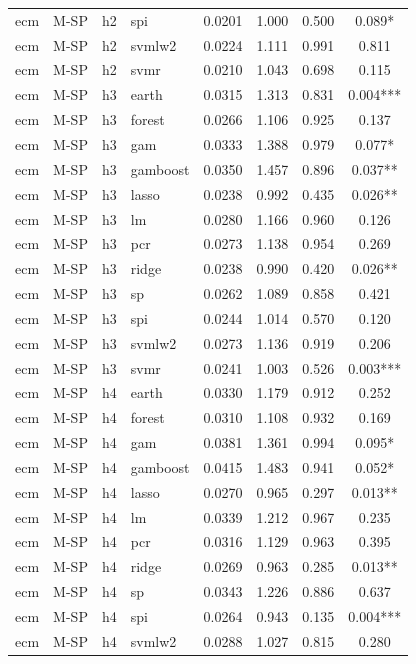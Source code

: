 \begin{ThreePartTable}
\begin{longtable}[t]{llclcccc}
ecm & M-SP & h2 & spi & 0.0201 & 1.000 & 0.500 & 0.089*\\
ecm & M-SP & h2 & svmlw2 & 0.0224 & 1.111 & 0.991 & 0.811\\
ecm & M-SP & h2 & svmr & 0.0210 & 1.043 & 0.698 & 0.115\\
\addlinespace
ecm & M-SP & h3 & earth & 0.0315 & 1.313 & 0.831 & 0.004***\\
ecm & M-SP & h3 & forest & 0.0266 & 1.106 & 0.925 & 0.137\\
ecm & M-SP & h3 & gam & 0.0333 & 1.388 & 0.979 & 0.077*\\
ecm & M-SP & h3 & gamboost & 0.0350 & 1.457 & 0.896 & 0.037**\\
ecm & M-SP & h3 & lasso & 0.0238 & 0.992 & 0.435 & 0.026**\\
ecm & M-SP & h3 & lm & 0.0280 & 1.166 & 0.960 & 0.126\\
ecm & M-SP & h3 & pcr & 0.0273 & 1.138 & 0.954 & 0.269\\
ecm & M-SP & h3 & ridge & 0.0238 & 0.990 & 0.420 & 0.026**\\
ecm & M-SP & h3 & sp & 0.0262 & 1.089 & 0.858 & 0.421\\
ecm & M-SP & h3 & spi & 0.0244 & 1.014 & 0.570 & 0.120\\
ecm & M-SP & h3 & svmlw2 & 0.0273 & 1.136 & 0.919 & 0.206\\
ecm & M-SP & h3 & svmr & 0.0241 & 1.003 & 0.526 & 0.003***\\
\addlinespace
ecm & M-SP & h4 & earth & 0.0330 & 1.179 & 0.912 & 0.252\\
ecm & M-SP & h4 & forest & 0.0310 & 1.108 & 0.932 & 0.169\\
ecm & M-SP & h4 & gam & 0.0381 & 1.361 & 0.994 & 0.095*\\
ecm & M-SP & h4 & gamboost & 0.0415 & 1.483 & 0.941 & 0.052*\\
ecm & M-SP & h4 & lasso & 0.0270 & 0.965 & 0.297 & 0.013**\\
ecm & M-SP & h4 & lm & 0.0339 & 1.212 & 0.967 & 0.235\\
ecm & M-SP & h4 & pcr & 0.0316 & 1.129 & 0.963 & 0.395\\
ecm & M-SP & h4 & ridge & 0.0269 & 0.963 & 0.285 & 0.013**\\
ecm & M-SP & h4 & sp & 0.0343 & 1.226 & 0.886 & 0.637\\
ecm & M-SP & h4 & spi & 0.0264 & 0.943 & 0.135 & 0.004***\\
ecm & M-SP & h4 & svmlw2 & 0.0288 & 1.027 & 0.815 & 0.280\\

\end{longtable}
\end{ThreePartTable}
